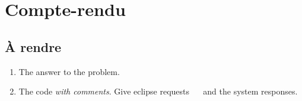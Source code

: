 \section{Compte-rendu}

\subsection{À rendre}

\begin{enumerate}
\item The answer to the problem.
\item The code \eclipse{} \emph{with comments}. Give eclipse requests
   and the system responses.
   \end{enumerate}

